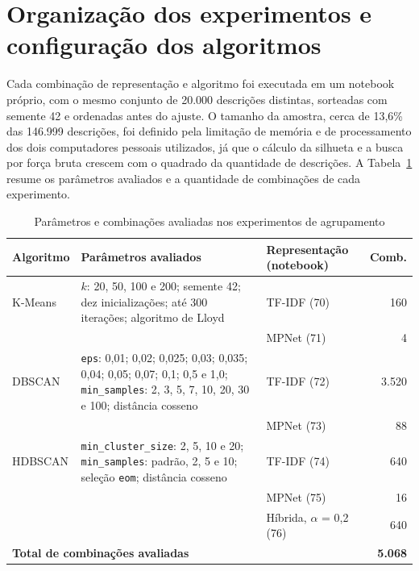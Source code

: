\documentclass[english,brazilian]{UNISINOSmonografia}
\begin{document}
\section{Organização dos experimentos e configuração dos algoritmos}
\label{sec:organizacao-experimentos}

Cada combinação de representação e algoritmo foi executada em um notebook próprio, com o mesmo conjunto de 20.000 descrições distintas, sorteadas com semente 42 e ordenadas antes do ajuste. O tamanho da amostra, cerca de 13,6\% das 146.999 descrições, foi definido pela limitação de memória e de processamento dos dois computadores pessoais utilizados, já que o cálculo da silhueta e a busca por força bruta crescem com o quadrado da quantidade de descrições. A Tabela~\ref{tab:execucoes} resume os parâmetros avaliados e a quantidade de combinações de cada experimento.

\begin{table}[!htb]
    \caption{Parâmetros e combinações avaliadas nos experimentos de agrupamento}
    \label{tab:execucoes}
    \centering
    \small
    \begin{tabularx}{\textwidth}{lXlr}
        \hline
        \textbf{Algoritmo} & \textbf{Parâmetros avaliados} & \textbf{Representação (notebook)} & \textbf{Comb.}\\
        \hline
        K-Means & $k$: 20, 50, 100 e 200; semente 42; dez inicializações; até 300 iterações; algoritmo de Lloyd & TF-IDF (70) & 160\\
         & & MPNet (71) & 4\\
        \hline
        DBSCAN & \texttt{eps}: 0,01; 0,02; 0,025; 0,03; 0,035; 0,04; 0,05; 0,07; 0,1; 0,5 e 1,0; \texttt{min\_samples}: 2, 3, 5, 7, 10, 20, 30 e 100; distância cosseno & TF-IDF (72) & 3.520\\
         & & MPNet (73) & 88\\
        \hline
        HDBSCAN & \texttt{min\_cluster\_size}: 2, 5, 10 e 20; \texttt{min\_samples}: padrão, 2, 5 e 10; seleção \texttt{eom}; distância cosseno & TF-IDF (74) & 640\\
         & & MPNet (75) & 16\\
         & & Híbrida, $\alpha$ = 0,2 (76) & 640\\
        \hline
        \multicolumn{3}{l}{\textbf{Total de combinações avaliadas}} & \textbf{5.068}\\
        \hline
    \end{tabularx}
\end{table}
\end{document}
